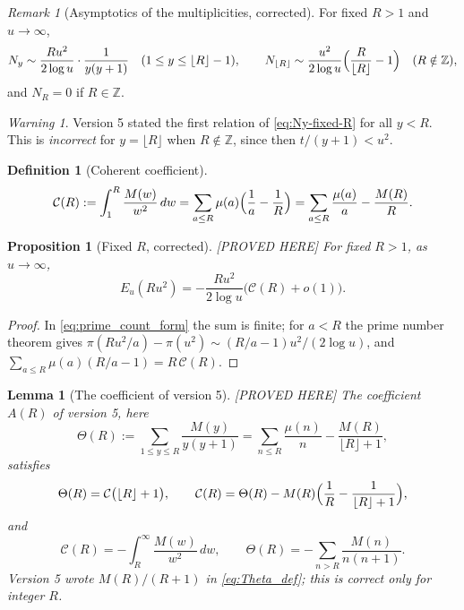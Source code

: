 \documentclass[11pt]{amsart}
\numberwithin{equation}{section}
\theoremstyle{plain}
\newtheorem{proposition}[theorem]{Proposition}
\newtheorem{lemma}[theorem]{Lemma}
\theoremstyle{definition}
\newtheorem{definition}[theorem]{Definition}
\theoremstyle{remark}
\newtheorem{remark}[theorem]{Remark}
\newtheorem{warning}[theorem]{Warning}
\newcommand{\Cc}{\mathcal{C}}
\begin{document}
\begin{remark}[Asymptotics of the multiplicities, corrected]
\label{rem:copy-count-asymptotic}
For fixed $R>1$ and $u\to\infty$,
\begin{equation}
\label{eq:Ny-fixed-R}
  N_y\sim\frac{Ru^2}{2\log u}\cdot\frac1{y(y+1)}\quad(1\le y\le\lfloor R\rfloor-1),
  \qquad
  N_{\lfloor R\rfloor}\sim\frac{u^2}{2\log u}\Bigl(\frac R{\lfloor R\rfloor}-1\Bigr)
  \quad(R\notin\mathbb{Z}),
\end{equation}
and $N_R=0$ if $R\in\mathbb{Z}$.
\end{remark}

\begin{warning}
\label{warn:v5_Ny}
Version 5 stated the first relation of \eqref{eq:Ny-fixed-R} for all $y<R$.
This is \emph{incorrect} for $y=\lfloor R\rfloor$ when $R\notin\mathbb{Z}$,
since then $t/(y+1)<u^2$.
\end{warning}

\begin{definition}[Coherent coefficient]
\label{def:coherent_coefficient}
\begin{equation}
\label{eq:C_def}
  \Cc(R):=\int_1^R\frac{M(w)}{w^2}\,dw
  =\sum_{a\le R}\mu(a)\Bigl(\frac1a-\frac1R\Bigr)
  =\sum_{a\le R}\frac{\mu(a)}a-\frac{M(R)}R .
\end{equation}
\end{definition}

\begin{proposition}[Fixed $R$, corrected]
\label{prop:fixed_R_corrected}
\emph{[PROVED HERE]} For fixed $R>1$, as $u\to\infty$,
\begin{equation}
\label{eq:E_fixed_R}
  E_u(Ru^2)=-\frac{Ru^2}{2\log u}\bigl(\Cc(R)+o(1)\bigr).
\end{equation}
\end{proposition}

\begin{proof}
In \eqref{eq:prime_count_form} the sum is finite; for $a<R$ the prime number
theorem gives $\pi(Ru^2/a)-\pi(u^2)\sim(R/a-1)u^2/(2\log u)$, and
$\sum_{a\le R}\mu(a)(R/a-1)=R\,\Cc(R)$.
\end{proof}

\begin{lemma}[The coefficient of version 5]
\label{lem:copy-weight-coefficient}
\emph{[PROVED HERE]} The coefficient $A(R)$ of version 5, here
\begin{equation}
\label{eq:Theta_def}
  \Theta(R):=\sum_{1\le y\le R}\frac{M(y)}{y(y+1)}
  =\sum_{n\le R}\frac{\mu(n)}n-\frac{M(R)}{\lfloor R\rfloor+1},
\end{equation}
satisfies
\begin{equation}
\label{eq:Theta_C}
  \Theta(R)=\Cc\bigl(\lfloor R\rfloor+1\bigr),\qquad
  \Cc(R)=\Theta(R)-M(R)\Bigl(\frac1R-\frac1{\lfloor R\rfloor+1}\Bigr),
\end{equation}
and
\begin{equation}
\label{eq:C_tail}
  \Cc(R)=-\int_R^\infty\frac{M(w)}{w^2}\,dw,\qquad
  \Theta(R)=-\sum_{n>R}\frac{M(n)}{n(n+1)}.
\end{equation}
Version 5 wrote $M(R)/(R+1)$ in \eqref{eq:Theta_def}; this is correct only
for integer $R$.
\end{lemma}
\end{document}
